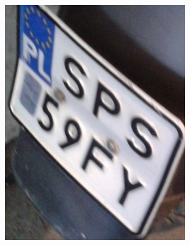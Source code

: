 \begin{figure}
  \centering
  \begin{subfigure}[b]{0.45\textwidth}
    \includegraphics[width=\textwidth]{img/detect-bg-bad-input}
    \label{fig:detect_bg_bad_input}
    \caption{}
  \end{subfigure}
  ~
  \begin{subfigure}[b]{0.45\textwidth}

\end{subfigure}
\end{figure}
